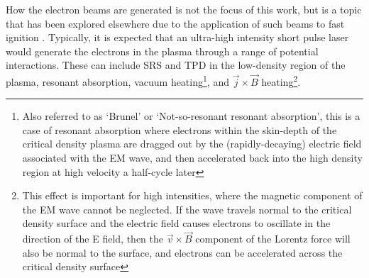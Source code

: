 
How the electron beams are generated is not the focus of this work, but is a topic that has been explored elsewhere due to the application of such beams to fast ignition \cite{Tabak2005, Kemp2014}. Typically, it is expected that an ultra-high intensity short pulse laser would generate the electrons in the plasma through a range of potential interactions. These can include SRS and TPD in the low-density region of the plasma,  resonant absorption, vacuum heating\footnote{Also referred to as `Brunel' or `Not-so-resonant resonant absorption', this is a case of resonant absorption where electrons within the skin-depth of the critical density plasma are dragged out by the (rapidly-decaying) electric field associated with the EM wave, and then accelerated back into the high density region at high velocity a half-cycle later}, and $\vec{j} \times \vec{B}$ heating\footnote{This effect is important for high intensities, where the magnetic component of the EM wave cannot be neglected. If the wave travels normal to the critical density surface and the electric field causes electrons to oscillate in the direction of the E field, then the $\vec{v} \times \vec{B}$ component of the Lorentz force will also be normal to the surface, and electrons can be accelerated across the critical density surface}\cite{Wilks1997}.


